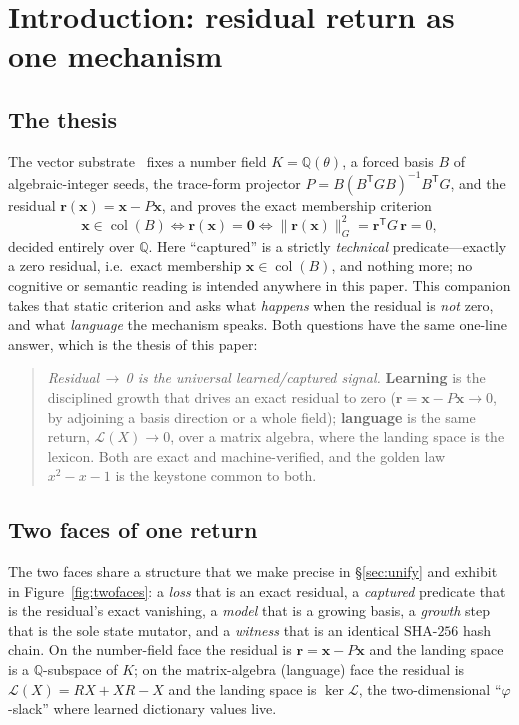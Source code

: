 \documentclass[11pt]{article}
\theoremstyle{plain}
\theoremstyle{definition}
\theoremstyle{remark}
\newcommand{\Q}{\mathbb{Q}}
\newcommand{\K}{K}
\newcommand{\rr}{\mathbf{r}}
\newcommand{\xx}{\mathbf{x}}
\newcommand{\GG}{G}
\newcommand{\BB}{B}
\newcommand{\transpose}{^{\mathsf{T}}}
\newcommand{\inv}{^{-1}}
\newcommand{\Lop}{\mathcal{L}}
\DeclareMathOperator{\col}{col}
\begin{document}
\tableofcontents

\section{Introduction: residual return as one mechanism}\label{sec:intro}

\subsection*{The thesis}
The vector substrate~\cite{VectorSubstrate} fixes a number field $\K=\Q(\theta)$, a forced basis $\BB$ of
algebraic-integer seeds, the trace-form projector $P=\BB(\BB\transpose\GG\BB)\inv\BB\transpose\GG$, and the
residual $\rr(\xx)=\xx-P\xx$, and proves the exact membership criterion
\begin{equation}\label{eq:capture}
   \xx\in\col(\BB)\iff \rr(\xx)=\mathbf 0 \iff \lVert\rr(\xx)\rVert_{\GG}^2=\rr\transpose\GG\,\rr=0,
\end{equation}
decided entirely over $\Q$. Here ``captured'' is a strictly \emph{technical} predicate---exactly a zero
residual, i.e.\ exact membership $\xx\in\col(\BB)$, and nothing more; no cognitive or semantic reading is
intended anywhere in this paper. This companion takes that static criterion
and asks what \emph{happens} when the residual is \emph{not} zero, and what \emph{language} the mechanism
speaks. Both questions have the same one-line answer, which is the thesis of this paper:

\begin{quote}
\emph{Residual$\,\to\,$0 is the universal learned/captured signal.} \textbf{Learning} is the disciplined
growth that drives an exact residual to zero ($\rr=\xx-P\xx\to0$, by adjoining a basis direction or a whole
field); \textbf{language} is the same return, $\Lop(X)\to0$, over a matrix algebra, where the landing space is
the lexicon. Both are exact and machine-verified, and the golden law $x^2-x-1$ is the keystone common to both.
\end{quote}

\subsection*{Two faces of one return}
The two faces share a structure that we make precise in \S\ref{sec:unify} and exhibit in
Figure~\ref{fig:twofaces}: a \emph{loss} that is an exact residual, a \emph{captured} predicate that is the
residual's exact vanishing, a \emph{model} that is a growing basis, a \emph{growth} step that is the sole
state mutator, and a \emph{witness} that is an identical $\mathrm{SHA}\text{-}256$ hash chain. On the
number-field face the residual is $\rr=\xx-P\xx$ and the landing space is a $\Q$-subspace of $\K$; on the
matrix-algebra (language) face the residual is $\Lop(X)=RX+XR-X$ and the landing space is $\ker\Lop$, the
two-dimensional ``$\varphi$-slack'' where learned dictionary values live.
\end{document}
